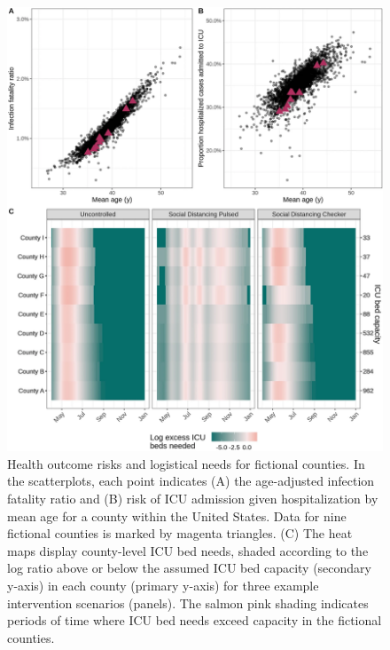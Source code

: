 \begin{figure}[!htb]%
    \centering
    \includegraphics{fig_pipeline/fig3a}
    \caption[Health outcome risks and logistical needs for fictional counties]{Health outcome risks and logistical needs for fictional counties. In the scatterplots, each point indicates (A) the age-adjusted infection fatality ratio and (B) risk of ICU admission given hospitalization by mean age for a county within the United States. Data for nine fictional counties is marked by magenta triangles. (C) The heat maps display county-level ICU bed needs, shaded according to the log ratio above or below the assumed ICU bed capacity (secondary y-axis) in each county (primary y-axis) for three example intervention scenarios (panels). The salmon pink shading indicates periods of time where ICU bed needs exceed capacity in the fictional counties.}
    \label{fig:pipeline-outcome}
\end{figure}

